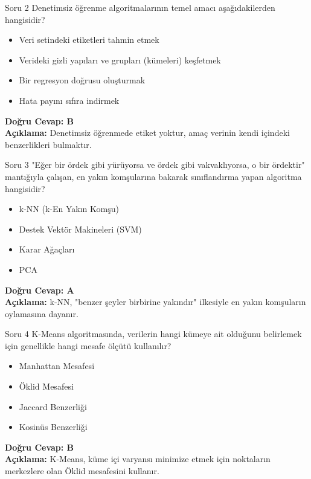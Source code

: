 \documentclass[12pt,a4paper]{article}
\begin{document}
\begin{testcard}{Soru 2}
    Denetimsiz öğrenme algoritmalarının temel amacı aşağıdakilerden hangisidir?
    \begin{itemize}
        \item[A)] Veri setindeki etiketleri tahmin etmek
        \item[B)] Verideki gizli yapıları ve grupları (kümeleri) keşfetmek
        \item[C)] Bir regresyon doğrusu oluşturmak
        \item[D)] Hata payını sıfıra indirmek
    \end{itemize}
    \tcblower
    \textbf{Doğru Cevap: B} \\
    \textbf{Açıklama:} Denetimsiz öğrenmede etiket yoktur, amaç verinin kendi içindeki benzerlikleri bulmaktır.
\end{testcard}

\begin{testcard}{Soru 3}
    "Eğer bir ördek gibi yürüyorsa ve ördek gibi vakvaklıyorsa, o bir ördektir" mantığıyla çalışan, en yakın komşularına bakarak sınıflandırma yapan algoritma hangisidir?
    \begin{itemize}
        \item[A)] k-NN (k-En Yakın Komşu)
        \item[B)] Destek Vektör Makineleri (SVM)
        \item[C)] Karar Ağaçları
        \item[D)] PCA
    \end{itemize}
    \tcblower
    \textbf{Doğru Cevap: A} \\
    \textbf{Açıklama:} k-NN, "benzer şeyler birbirine yakındır" ilkesiyle en yakın komşuların oylamasına dayanır.
\end{testcard}

\begin{testcard}{Soru 4}
    K-Means algoritmasında, verilerin hangi kümeye ait olduğunu belirlemek için genellikle hangi mesafe ölçütü kullanılır?
    \begin{itemize}
        \item[A)] Manhattan Mesafesi
        \item[B)] Öklid Mesafesi
        \item[C)] Jaccard Benzerliği
        \item[D)] Kosinüs Benzerliği
    \end{itemize}
    \tcblower
    \textbf{Doğru Cevap: B} \\
    \textbf{Açıklama:} K-Means, küme içi varyansı minimize etmek için noktaların merkezlere olan Öklid mesafesini kullanır.
\end{testcard}
\end{document}
